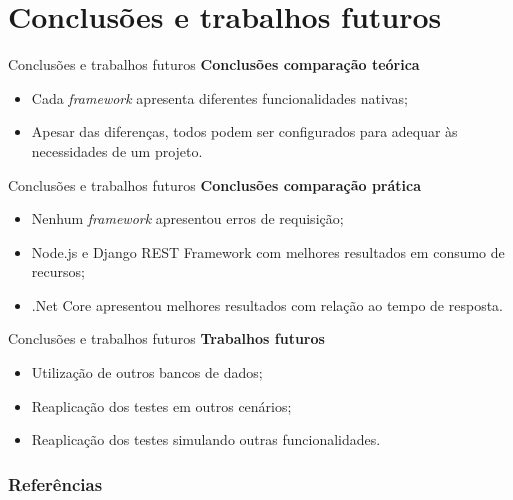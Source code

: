 \documentclass{libs/ufc_format}
\begin{document}
\section{Conclusões e trabalhos futuros}

\begin{frame}{Conclusões e trabalhos futuros}
    \textbf{Conclusões comparação teórica}
    \begin{itemize}
        \item Cada \textit{framework} apresenta diferentes funcionalidades nativas;
        \vspace*{0.5em}
        \item Apesar das diferenças, todos podem ser configurados para adequar às necessidades de um projeto.
    \end{itemize}
\end{frame}

\begin{frame}{Conclusões e trabalhos futuros}
    \textbf{Conclusões comparação prática}
    \begin{itemize}
        \item Nenhum \textit{framework} apresentou erros de requisição;
        \vspace*{0.5em}
        \item Node.js e Django REST Framework com melhores resultados em consumo de recursos;
        \vspace*{0.5em}
        \item .Net Core apresentou melhores resultados com relação ao tempo de resposta.
    \end{itemize}
\end{frame}

\begin{frame}{Conclusões e trabalhos futuros}
    \textbf{Trabalhos futuros}
    \begin{itemize}
        \item Utilização de outros bancos de dados;
        \vspace*{0.5em}
        \item Reaplicação dos testes em outros cenários;
        \vspace*{0.5em}
        \item Reaplicação dos testes simulando outras funcionalidades.
    \end{itemize}
\end{frame}

\begin{frame}[allowframebreaks]
    \frametitle{Referências}
    \printbibliography
\end{frame}
\end{document}
